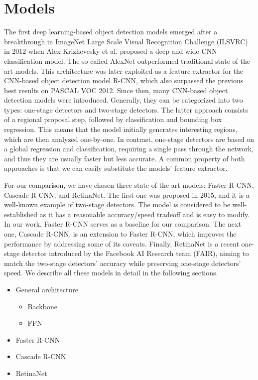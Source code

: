 \chapter{Models}
The first deep learning-based object detection models emerged after a breakthrough in ImageNet Large Scale Visual Recognition Challenge (ILSVRC) in 2012 when Alex Krizhevesky et al. proposed a deep and wide CNN classification model. The so-called AlexNet outperformed traditional state-of-the-art models.  This architecture was later exploited as a feature extractor for the CNN-based object detection model R-CNN, which also surpassed the previous best results on PASCAL VOC 2012. Since then, many CNN-based object detection models were introduced. Generally, they can be categorized into two types: one-stage detectors and two-stage detectors. The latter approach consists of a regional proposal step, followed by classification and bounding box regression. This means that the model initially generates interesting regions, which are then analyzed one-by-one. In contrast, one-stage detectors are based on a global regression and classification, requiring a single pass through the network, and thus they are usually faster but less accurate. A common property of both approaches is that we can easily substitute the models' feature extractor. 

For our comparison, we have chosen three state-of-the-art models: Faster R-CNN, Cascade R-CNN, and RetinaNet. The first one was proposed in 2015, and it is a well-known example of two-stage detectors. The model is considered to be well-established as it has a reasonable accuracy/speed tradeoff and is easy to modify. In our work, Faster R-CNN serves as a baseline for our comparison. The next one, Cascade R-CNN, is an extension to Faster R-CNN, which improves the performance by addressing some of its caveats. Finally, RetinaNet is a recent one-stage detector introduced by the Facebook AI Research team (FAIR), aiming to match the two-stage detectors' accuracy while preserving one-stage detectors' speed. We describe all these models in detail in the following sections.

\begin{itemize}
\item General architecture
\begin{itemize}
\item Backbone
\item FPN
\end{itemize}
\item Faster R-CNN
\item Cascade R-CNN
\item RetinaNet
\end{itemize}
